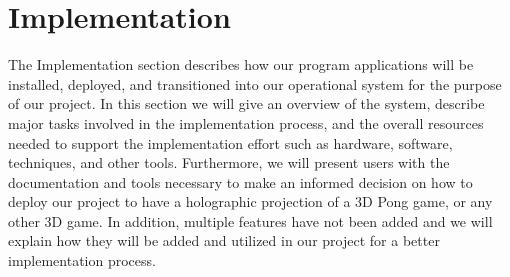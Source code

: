 \documentclass{sig-alternate}
\begin{document}
\section{Implementation}
\label{implementation}
	The Implementation section describes how our program applications will be installed, deployed, and transitioned into our operational system for the purpose of our project. In this section we will give an overview of the system, describe major tasks involved in the implementation process, and the overall resources needed to support the implementation effort such as hardware, software, techniques, and other tools. Furthermore, we will present users with the documentation and tools necessary to make an informed decision on how to deploy our project to have a holographic projection of a 3D Pong game, or any other 3D game. In addition, multiple features have not been added and we will explain how they will be added and utilized in our project for a better implementation process. 
	
\end{document}
